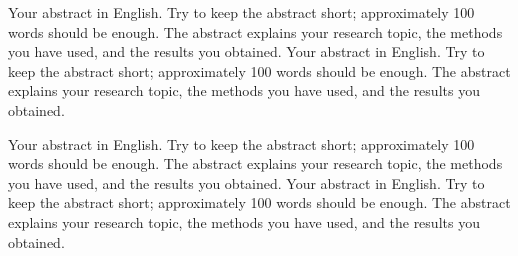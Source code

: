 \documentclass[english,12pt,a4paper,pdftex,elec,utf8]{aaltothesis}
\begin{document}
\makecoverpage



\begin{abstractpage}[english]
  Your abstract in English. Try to keep the abstract short; approximately 
  100 words should be enough. The abstract explains your research topic, 
  the methods you have used, and the results you obtained.  
  Your abstract in English. Try to keep the abstract short; approximately 
  100 words should be enough. The abstract explains your research topic, 
  the methods you have used, and the results you obtained.  

  Your abstract in English. Try to keep the abstract short; approximately 
  100 words should be enough. The abstract explains your research topic, 
  the methods you have used, and the results you obtained.  
  Your abstract in English. Try to keep the abstract short; approximately 
  100 words should be enough. The abstract explains your research topic, 
  the methods you have used, and the results you obtained.  
\end{abstractpage}

\newpage
%
\end{document}
